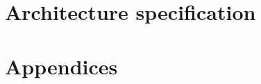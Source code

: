 \documentclass[12pt,letterpaper,twoside,openright,fleqn]{report}
\begin{document}







\part{Architecture specification}
\label{part:isa}





\appendix
\part{Appendices}









\cleardoublepage
{}
{}
\printbibliography

\end{document}
